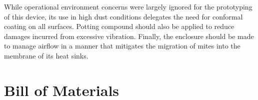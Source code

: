 While operational environment concerns were largely ignored for the prototyping of this device, its use in high dust conditions delegates the need for conformal coating on all surfaces.
Potting compound should also be applied to reduce damages incurred from excessive vibration.
Finally, the enclosure should be made to manage airflow in a manner that mitigates the migration of mites into the membrane of its heat sinks.

\section{Bill of Materials}